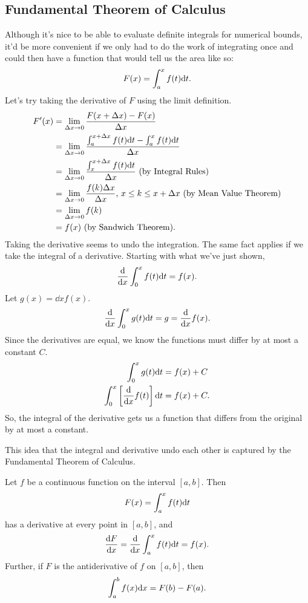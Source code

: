 \subsection{Fundamental Theorem of Calculus}
Although it's nice to be able to evaluate definite integrals for numerical bounds, it'd be more convenient if we only had to do the work of integrating once and could then have a function that would tell us the area like so:
\begin{equation*}
	F(x) = \int_{a}^{x}{f(t)\mathrm{d} t}.
\end{equation*}
Let's try taking the derivative of $F$ using the limit definition.
\begin{align*}
	F^\prime(x) &= \lim_{\Delta x \to 0}{\frac{F(x+\Delta x)-F(x)}{\Delta x}} \\
	&= \lim_{\Delta x\to 0}{\frac{\int_{a}^{x+\Delta x}f(t)\mathrm{d} t - \int_{a}^{x}{f(t)\mathrm{d} t}}{\Delta x}} \\
	&= \lim_{\Delta x\to 0}{\frac{\int_{x}^{x+\Delta x}{f(t)\mathrm{d} t}}{\Delta x}}\text{ (by Integral Rules)}\\
	&= \lim_{\Delta x\to 0}{\frac{f(k)\Delta x}{\Delta x}}\text{, }x\leq k \leq x + \Delta x\text{ (by Mean Value Theorem)} \\
	&= \lim_{\Delta x\to 0}{f(k)} \\
	&= f(x) \text{ (by Sandwich Theorem)}.
\end{align*}
Taking the derivative seems to undo the integration.
The same fact applies if we take the integral of a derivative.
Starting with what we've just shown,
\begin{equation*}
	\frac{\mathrm{d} }{\mathrm{d} x}\int_{0}^{x}{f(t)\mathrm{d} t} = f(x).
\end{equation*}
Let $g(x) = \dd{}{x}f(x)$.
\begin{equation*}
	\frac{\mathrm{d} }{\mathrm{d} x}\int_{0}^{x}{g(t)\mathrm{d} t} = g = \frac{\mathrm{d} }{\mathrm{d} x}f(x).
\end{equation*}
Since the derivatives are equal, we know the functions must differ by at most a constant $C$.
\begin{align*}
	\int_{0}^{x}{g(t)\mathrm{d} t} &= f(x) + C \\
	\int_{0}^{x}{\left[\frac{\mathrm{d} }{\mathrm{d} x}f(t)\right]\mathrm{d} t} &= f(x) + C.
\end{align*}
So, the integral of the derivative gets us a function that differs from the original by at most a constant.


This idea that the integral and derivative undo each other is captured by the Fundamental Theorem of Calculus.
\begin{theorem}
	Let $f$ be a continuous function on the interval $[a,b]$.
	Then
	\begin{equation*}
		F(x) = \int_{a}^{x}{f(t)\mathrm{d} t}
	\end{equation*}
	has a derivative at every point in $[a,b]$, and
	\begin{equation*}
		\frac{\mathrm{d} F}{\mathrm{d} x} = \frac{\mathrm{d} }{\mathrm{d} x}\int_{a}^{x}{f(t)\mathrm{d} t} = f(x).
	\end{equation*}
	Further, if $F$ is the antiderivative of $f$ on $[a,b]$, then
	\begin{equation*}
		\int_{a}^{b}{f(x)\mathrm{d} x} = F(b) - F(a).
	\end{equation*}
\end{theorem}

